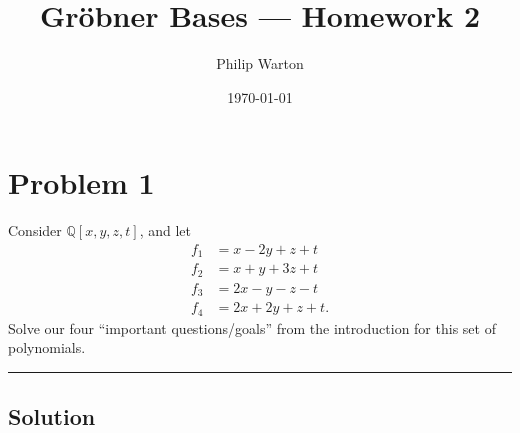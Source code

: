 \documentclass{article}
\theoremstyle{definition}
\begin{document}
\title{Gr{\"o}bner Bases --- Homework 2}
\author{Philip Warton}
\date{\today}
\maketitle

\section*{Problem 1}
Consider $\mathbb{Q}[x,y,z,t]$, and let 
\begin{align*}
    f_1 &= x - 2y + z + t \\
    f_2 &= x + y + 3z + t \\
    f_3 &= 2x - y -z - t \\
    f_4 &= 2x + 2y + z + t
.\end{align*}
Solve our four ``important questions/goals'' from the introduction for 
this set of polynomials.
\\
\par\noindent\rule{\textwidth}{0.4pt}
\subsection*{Solution}
\end{document}
